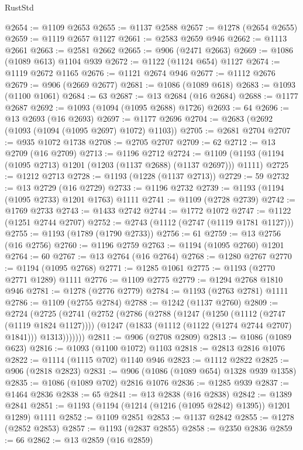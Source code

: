 \begin{lexlean}{RustStd}
\begin{coremodule}
@2654 := @1109 @2653
@2655 := @1137 @2588
@2657 := @1278 (@2654 @2655)
@2659 := @1119 @2657 @1127
@2661 := @2583 @2659 @946
@2662 := @1113 @2661
@2663 := @2581 @2662
@2665 := @906 (@2471 @2663)
@2669 := @1086 (@1089 @613) @1104 @939
@2672 := @1122 (@1124 @654) @1127
@2674 := @1119 @2672 @1165
@2676 := @1121 @2674 @946
@2677 := @1112 @2676
@2679 := @906 (@2669 @2677)
@2681 := @1086 (@1089 @618)
@2683 := @1093 (@1100 @1061)
@2684 := 63
@2687 := @13 @2684 (@16 @2684)
@2688 := @1177 @2687
@2692 := @1093 (@1094 (@1095 @2688) @1726)
@2693 := 64
@2696 := @13 @2693 (@16 @2693)
@2697 := @1177 @2696
@2704 := @2683 (@2692 (@1093 (@1094 (@1095 @2697) @1072) @1103))
@2705 := @2681 @2704
@2707 := @935 @1072 @1738
@2708 := @2705 @2707
@2709 := 62
@2712 := @13 @2709 (@16 @2709)
@2713 := @1196 @2712
@2724 := @1109 (@1193 (@1194 (@1095 @2713) @1201 (@1203 (@1137 @2688) (@1137 @2697))) @1111)
@2725 := @1212 @2713
@2728 := @1193 (@1228 (@1137 @2713))
@2729 := 59
@2732 := @13 @2729 (@16 @2729)
@2733 := @1196 @2732
@2739 := @1193 (@1194 (@1095 @2733) @1201 @1763) @1111
@2741 := @1109 (@2728 @2739)
@2742 := @1769 @2733
@2743 := @1433 @2742
@2744 := @1772 @1072
@2747 := @1122 (@1251 @2744 @2707)
@2752 := @2743 (@1112 (@2747 (@1119 @1781 @1127)))
@2755 := @1193 (@1789 (@1790 @2733))
@2756 := 61
@2759 := @13 @2756 (@16 @2756)
@2760 := @1196 @2759
@2763 := @1194 (@1095 @2760) @1201
@2764 := 60
@2767 := @13 @2764 (@16 @2764)
@2768 := @1280 @2767
@2770 := @1194 (@1095 @2768)
@2771 := @1285 @1061
@2775 := @1193 (@2770 @2771 @1289) @1111
@2776 := @1109 @2775
@2779 := @1294 @2768 @1810 @946
@2781 := @1278 (@2776 @2779)
@2784 := @1193 (@2763 @2781) @1111
@2786 := @1109 (@2755 @2784)
@2788 := @1242 (@1137 @2760)
@2809 := @2724
    (@2725
      (@2741
        (@2752
          (@2786
            (@2788
              (@1247
                (@1250 (@1112 (@2747 (@1119 @1824 @1127))))
                (@1247 (@1833 (@1112 (@1122 (@1274 @2744 @2707) @1841))) @1313)))))))
@2811 := @906 (@2708 @2809)
@2813 := @1086 (@1089 @623)
@2816 := @1093 (@1100 @1072) @1103
@2818 := @2813 @2816 @1076
@2822 := @1114 (@1115 @702) @1140 @946
@2823 := @1112 @2822
@2825 := @906 (@2818 @2823)
@2831 := @906 (@1086 (@1089 @654) @1328 @939 @1358)
@2835 := @1086 (@1089 @702) @2816 @1076
@2836 := @1285 @939
@2837 := @1464 @2836
@2838 := 65
@2841 := @13 @2838 (@16 @2838)
@2842 := @1389 @2841
@2851 := @1193 (@1194 (@1214 (@1216 (@1095 @2842) @1395)) @1201 @1289) @1111
@2852 := @1109 @2851
@2853 := @1137 @2842
@2855 := @1278 (@2852 @2853)
@2857 := @1193 (@2837 @2855)
@2858 := @2350 @2836
@2859 := 66
@2862 := @13 @2859 (@16 @2859)

\end{coremodule}
\end{lexlean}

